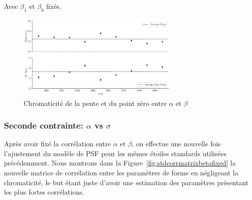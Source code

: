 \documentclass[../main/main.tex]{subfiles}
\begin{document}
Avec $\beta_{1}$ et $\beta_{0}$ fixés.

\begin{figure}[ht]
  \centering
  \includegraphics[width=0.7\textwidth]{../figures/06_irf/chromaticitybeta_alpha_corr.pdf}
  \caption[Chromaticité de la pente et du point zéro entre $\alpha$ et $\beta$]{Chromaticité de la pente et du point zéro entre $\alpha$ et $\beta$}
  \label{fig:chromslope_zp_alphabeta}
\end{figure}


\subsubsection{Seconde contrainte: $\alpha$ vs $\sigma$}


Après avoir fixé la corrélation entre $\alpha$ et $\beta$, on effectue
une nouvelle fois l'ajustement du modèle de PSF pour les mêmes étoiles
standards utilisées précédemment. Nous montrons dans la
Figure~\ref{fig:stdcorrmatrixbetafixed} la nouvelle matrice de
corrélation entre les paramètres de forme en négligeant la chromaticité,
le but étant juste d'avoir une estimation des paramètres présentant les
plus fortes corrélations.
\end{document}
